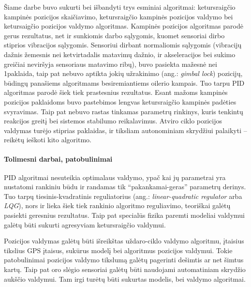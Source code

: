 \documentclass[12pt, a4paper, lithuanian, final]{article}
\begin{document}
Šiame darbe buvo sukurti bei išbandyti trys esminiai algoritmai: ketursraigčio kampinės pozicijos skaičiavimo, ketursraigčio kampinės pozicijos valdymo bei ketursaigčio pozicijos valdymo algoritmas.
Kampinės pozicijos algoritmas parodė gerus rezultatus, net ir sunkiomis darbo sąlygomis, kuomet sensoriai dirbo stiprios vibracijos sąlygomis.
Sensoriui dirbant normaliomis sąlygomis (vibracijų dažnis žemesnis nei ketvirtadalis matavimų dažnio, ir akseleracijos bei sukimo greičiai neviršyja sensoriaus matavimo ribų), buvo pasiekta mažesnė nei 1\degree paklaida, taip pat nebuvo aptikta jokių užrakinimo (ang.: \textit{gimbal lock}) pozicijų, būdingų panašiems algoritmams besiremiantiems oilerio kampais.
Tuo tarpu PID algoritmas parodė šiek tiek prastesnius rezultatus.
Esant mažoms kampinės pozicijos paklaidoms buvo pastebimos lengvas ketursraigčio kampinės padėties svyravimas.
Taip pat nebuvo rastas tinkamas parametrų rinkinys, kuris tenkintų reakcijos greitį bei sistemos stabilumo reikalavimus.
Atviro ciklo pozicijos valdymas turėjo stiprias paklaidas, ir tiksliam autonominiam skrydžiui palaikyti -- reikėtų ieškoti kito algoritmo.


\paragraph{Tolimesni darbai, patobulinimai}

PID algoritmai nesuteikia optimalaus valdymo, ypač kai jų parametrai yra nustatomi rankiniu būdu ir randamas tik "`pakankamai-geras"' parametrų derinys.
Tuo tarpų tiesinis-kvadratinis reguliatorius (ang.: \textit{linear-quadratic regulator} arba \textit{LQG}), nors ir lieka šiek tiek rankinio algoritmo reguliavimo, teoriškai galėtų pasiekti geresnius rezultatus.
Taip pat specialūs fizika paremti modeliai valdymui galėtų būti sukurti agresyviam ketursraigčio valdymui.

Pozicijos valdymas galėtų būti išreikštas uždaro-ciklo valdymo algoritmu, įtaisius tikslius GPS įtaisus, sukūrus modelį bei algoritmus pozicijos valdymui.
Tokie patobulinimai pozicijos valdymo tikslumą galėtų pagerinti dešimtis ar net šimtus kartų.
Taip pat oro slėgio sensoriai galėtų būti naudojami automatiniam skrydžio aukščio valdymui.
Tam irgi turėtų būti sukurtas modelis, bei valdymo algoritmai.




\end{document}

